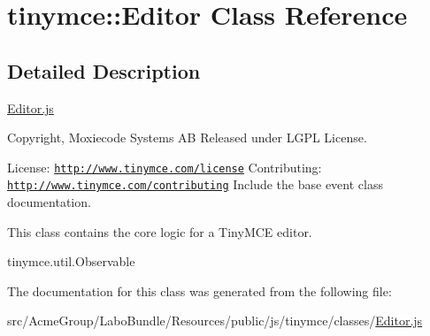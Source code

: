 \hypertarget{classtinymce_1_1_editor}{\section{tinymce\+:\+:Editor Class Reference}
\label{classtinymce_1_1_editor}
}


\subsection{Detailed Description}
\hyperlink{_editor_8js}{Editor.\+js}

Copyright, Moxiecode Systems A\+B Released under L\+G\+P\+L License.

License\+: \href{http://www.tinymce.com/license}{\tt http\+://www.\+tinymce.\+com/license} Contributing\+: \href{http://www.tinymce.com/contributing}{\tt http\+://www.\+tinymce.\+com/contributing} Include the base event class documentation.


\begin{DoxyCodeInclude}
\end{DoxyCodeInclude}
 This class contains the core logic for a Tiny\+M\+C\+E editor.

tinymce.\+util.\+Observable 

The documentation for this class was generated from the following file\+:\begin{DoxyCompactItemize}
\item 
src/\+Acme\+Group/\+Labo\+Bundle/\+Resources/public/js/tinymce/classes/\hyperlink{_editor_8js}{Editor.\+js}\end{DoxyCompactItemize}
